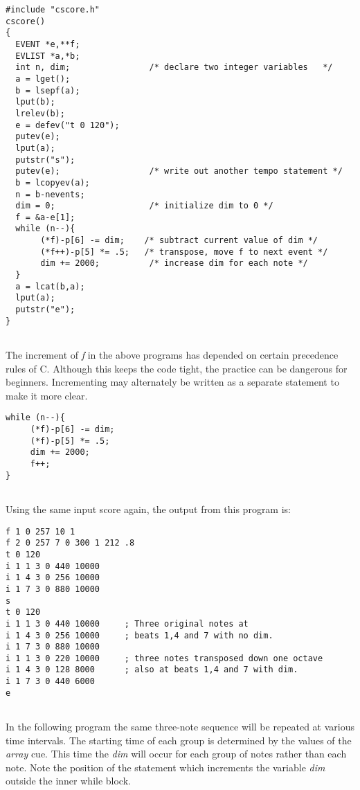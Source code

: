  
\begin{lstlisting}
#include "cscore.h" 
cscore() 
{ 
  EVENT *e,**f; 
  EVLIST *a,*b; 
  int n, dim;                /* declare two integer variables   */ 
  a = lget(); 
  b = lsepf(a); 
  lput(b); 
  lrelev(b); 
  e = defev("t 0 120"); 
  putev(e); 
  lput(a); 
  putstr("s"); 
  putev(e);                  /* write out another tempo statement */ 
  b = lcopyev(a); 
  n = b-nevents; 
  dim = 0;                   /* initialize dim to 0 */ 
  f = &a-e[1]; 
  while (n--){ 
       (*f)-p[6] -= dim;    /* subtract current value of dim */ 
       (*f++)-p[5] *= .5;   /* transpose, move f to next event */ 
       dim += 2000;          /* increase dim for each note */ 
  } 
  a = lcat(b,a); 
  lput(a); 
  putstr("e");
} 
      
\end{lstlisting}


 


  The increment of \emph{f}
 in the above programs has depended on certain precedence rules of C. Although this keeps the code tight, the practice can be dangerous for beginners. Incrementing may alternately be written as a separate statement to make it more clear. 


 
\begin{lstlisting}
while (n--){ 
     (*f)-p[6] -= dim; 
     (*f)-p[5] *= .5; 
     dim += 2000; 
     f++; 
}
      
\end{lstlisting}


 


  Using the same input score again, the output from this program is: 


 
\begin{lstlisting}
f 1 0 257 10 1 
f 2 0 257 7 0 300 1 212 .8 
t 0 120 
i 1 1 3 0 440 10000 
i 1 4 3 0 256 10000 
i 1 7 3 0 880 10000 
s 
t 0 120 
i 1 1 3 0 440 10000     ; Three original notes at 
i 1 4 3 0 256 10000     ; beats 1,4 and 7 with no dim. 
i 1 7 3 0 880 10000 
i 1 1 3 0 220 10000     ; three notes transposed down one octave 
i 1 4 3 0 128 8000      ; also at beats 1,4 and 7 with dim. 
i 1 7 3 0 440 6000 
e
      
\end{lstlisting}


 


  In the following program the same three-note sequence will be repeated at various time intervals. The starting time of each group is determined by the values of the \emph{array}
 cue. This time the \emph{dim}
 will occur for each group of notes rather than each note. Note the position of the statement which increments the variable \emph{dim}
 outside the inner while block. 


